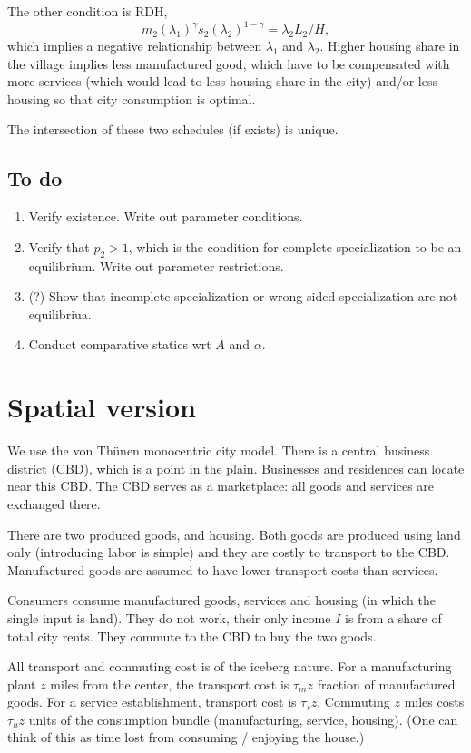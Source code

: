 \documentclass{amsart}
\theoremstyle{definition}
\theoremstyle{remark}
\numberwithin{equation}{section}
\begin{document}
The other condition is RDH,
\begin{equation}
m_2(\lambda_1)^\gamma s_2(\lambda_2)^{1-\gamma} = \lambda_2 L_2/H,
\end{equation}
which implies a negative relationship between $\lambda_1$ and $\lambda_2$. Higher housing share in the village implies less manufactured good, which have to be compensated with more services (which would lead to less housing share in the city) and/or less housing so that city consumption is optimal.

The intersection of these two schedules (if exists) is unique.
\subsection{To do}
\begin{enumerate}
  \item Verify existence. Write out parameter conditions.
  \item Verify that $p_2>1$, which is the condition for complete specialization to be an equilibrium. Write out parameter restrictions.
  \item (?) Show that incomplete specialization or wrong-sided specialization are not equilibriua.
  \item Conduct comparative statics wrt $A$ and $\alpha$.
\end{enumerate}
\section{Spatial version}
We use the von Th\"unen monocentric city model. There is a central business district (CBD), which is a point in the plain. Businesses and residences can locate near this CBD. The CBD serves as a marketplace: all goods and services are exchanged there.

There are two produced goods, and housing. Both goods are produced using land only (introducing labor is simple) and they are costly to transport to the CBD. Manufactured goods are assumed to have lower transport costs than services.

Consumers consume manufactured goods, services and housing (in which the single input is land). They do not work, their only income $I$ is from a share of total city rents. They commute to the CBD to buy the two goods.

All transport and commuting cost is of the iceberg nature. For a manufacturing plant $z$ miles from the center, the transport cost is $\tau_m z$ fraction of manufactured goods. For a service establishment, transport cost is $\tau_s z$. Commuting $z$ miles costs $\tau_h z$ units of the consumption bundle (manufacturing, service, housing). (One can think of this as time lost from consuming / enjoying the house.)
\end{document}
